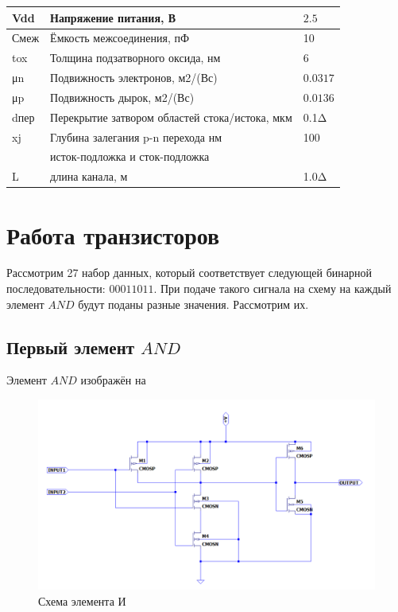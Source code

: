 \documentclass[a4paper,14pt]{article}
\begin{document}
\begin{table}[H]
\begin{center}
\begin{tabular}{|l|l|l|}
		Vdd      & Напряжение питания, В                                                       & $2.5     $ \\ \hline
		Смеж     & Ёмкость межсоединения, пФ                                                   & 10 \\ \hline
		tox      & Толщина подзатворного оксида, нм                                            & $6       $ \\ \hline
		μn       & Подвижность электронов, м2/(Вс)                                             & $0.0317  $ \\ \hline
		μp       & Подвижность дырок, м2/(Вс)                                                  & $0.0136  $ \\ \hline
		dпер     & Перекрытие затвором областей стока/истока, мкм                              & 0.1Δ    \\ \hline
		xj       & Глубина залегания p-n перехода нм                                           & 100 \\ 
		& исток-подложка и сток-подложка                                              & \\ \hline
		L        & длина канала, м                                                             & 1.0Δ     \\ \hline
	\end{tabular}
	\end{center}
\end{table}


\section{Работа транзисторов}

Рассмотрим 27 набор данных, который соответствует следующей бинарной последовательности: $0	0	0	1	1	0	1	1$. При подаче такого сигнала на схему на каждый элемент $AND$ будут поданы разные значения. Рассмотрим их.

\subsection{Первый элемент $AND$}

Элемент $AND$ изображён на 

\begin{figure}[H]
	\centering		
	\includegraphics[width=\linewidth]{image/schema_and}
	\caption{Схема элемента И}\label{img:schema_and}
\end{figure}
\end{document}
